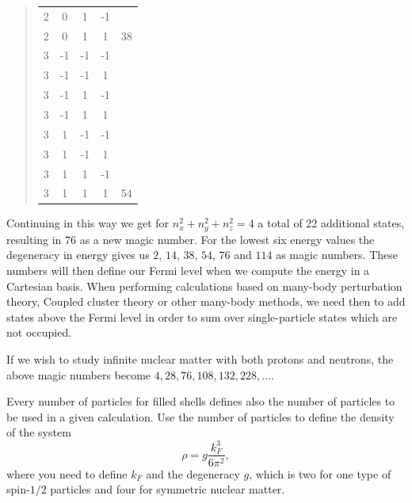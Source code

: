 \begin{quote}
\begin{tabular}{ccccc}
2                               & 0       & 1       & -1      &                            \\
2                               & 0       & 1       & 1       & 38                         \\
\hline
3                               & -1      & -1      & -1      &                            \\
3                               & -1      & -1      & 1       &                            \\
3                               & -1      & 1       & -1      &                            \\
3                               & -1      & 1       & 1       &                            \\
3                               & 1       & -1      & -1      &                            \\
3                               & 1       & -1      & 1       &                            \\
3                               & 1       & 1       & -1      &                            \\
3                               & 1       & 1       & 1       & 54                         \\
\hline
\end{tabular}
\end{quote}


Continuing in this way we get for $n_{x}^{2}+n_{y}^{2}+n_{z}^{2}=4$ a
total of 22 additional states, resulting in $76$ as a new magic
number. For the lowest six energy values the degeneracy in energy
gives us $2$, $14$, $38$, $54$, $76$ and $114$ as magic numbers. These
numbers will then define our Fermi level when we compute the energy in
a Cartesian basis. When performing calculations based on many-body
perturbation theory, Coupled cluster theory or other many-body
methods, we need then to add states above the Fermi level in order to
sum over single-particle states which are not occupied.

If we wish to study infinite nuclear matter with both protons and
neutrons, the above magic numbers become $4, 28, 76, 108, 132,
228, \dots$.

Every number of particles for filled shells defines also the number of
particles to be used in a given calculation. Use the number of
particles to define the density of the system
\[
\rho = g \frac{k_F^3}{6\pi^2},
\]
where you need to define $k_F$ and the degeneracy $g$, which is two
for one type of spin-$1/2$ particles and four for symmetric nuclear
matter.

